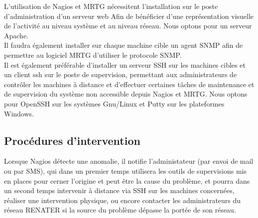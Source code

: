 \documentclass[a4paper]{article}
\begin{document}
L'utilisation de Nagios et MRTG nécessitent l'installation sur le poste d'administration d'un serveur web Afin de bénéficier d'une représentation visuelle de l'activité au niveau système et au niveau réseau. Nous optons pour un serveur Apache.\\
Il faudra également installer sur chaque machine cible un agent SNMP afin de permettre au logiciel MRTG d'utiliser le protocole SNMP.\\
Il est également préférable d'installer un serveur SSH sur les machines cibles et un client ssh sur le poste de supervision, permettant aux administrateurs de contrôler les machines à distance et d'effectuer certaines tâches de maintenance et de supervision du système non accessible depuis Nagios et MRTG. 
Nous optons pour OpenSSH sur les systèmes Gnu/Linux et Putty sur les plateformes Windows. 
\subsection{Procédures d'intervention}

Lorsque Nagios détecte une anomalie, il notifie l'administateur (par envoi de mail ou par SMS), qui dans un premier temps utilisera les outils de supervisions mis en places pour cerner l'origine et peut être la cause du problème, et pourra dans un second temps intervenir à distance via SSH sur les machines concernées, réaliser une intervention physique, ou encore contacter les administrateurs du réseau RENATER si la source du problème dépasse la portée de son réseau.


%   
%   
%
\end{document}
